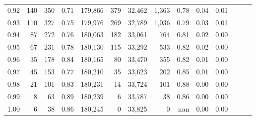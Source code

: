 \begin{tabular}{rrrrrrrrrrrrrr}
0.92 &    140 &  350 &  0.71 &  179,866 &      379 &  32,462 &   1,363 &  0.78 &  0.04 &      0.01 \\
0.93 &    110 &  327 &  0.75 &  179,976 &      269 &  32,789 &   1,036 &  0.79 &  0.03 &      0.01 \\
0.94 &     87 &  272 &  0.76 &  180,063 &      182 &  33,061 &     764 &  0.81 &  0.02 &      0.00 \\
0.95 &     67 &  231 &  0.78 &  180,130 &      115 &  33,292 &     533 &  0.82 &  0.02 &      0.00 \\
0.96 &     35 &  178 &  0.84 &  180,165 &       80 &  33,470 &     355 &  0.82 &  0.01 &      0.00 \\
0.97 &     45 &  153 &  0.77 &  180,210 &       35 &  33,623 &     202 &  0.85 &  0.01 &      0.00 \\
0.98 &     21 &  101 &  0.83 &  180,231 &       14 &  33,724 &     101 &  0.88 &  0.00 &      0.00 \\
0.99 &      8 &   63 &  0.89 &  180,239 &        6 &  33,787 &      38 &  0.86 &  0.00 &      0.00 \\
1.00 &      6 &   38 &  0.86 &  180,245 &        0 &  33,825 &       0 &   nan &  0.00 &      0.00 \\
\bottomrule
\end{tabular}
